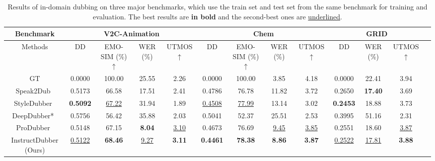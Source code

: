 \begin{table}[!t]
  \centering

  \resizebox{1.0\linewidth}{!}
  {

    \begin{tabular}{c|cccc|cccc|cccc|}
    \hline
    
    Benchmark & \multicolumn{4}{c|}{V2C-Animation} & \multicolumn{4}{c|}{Chem} & \multicolumn{3}{c}{GRID} \\
    \midrule
    Methods 
    & DD  
    & \small{EMO-SIM} (\%) $\uparrow$
    & WER (\%) 
    & \small{UTMOS} $\uparrow$   
    & DD  
    & \small{EMO-SIM} (\%) $\uparrow$
    & WER (\%) 
    & \small{UTMOS} $\uparrow$   
    & DD  
    & WER (\%) 
    & \small{UTMOS} $\uparrow$     \\
    \midrule
    GT  & 0.0000 & 100.00 & 25.55 & 2.26 & 0.0000 & 100.00 & 3.85 & 4.18 & 0.0000 & 22.41 & 3.94\\
    \midrule
    Speak2Dub~\cite{spk2dub} & 0.5173 & 66.58 & 17.51 & 2.41 & 0.4786 & 76.78 & 11.82 & 3.72 & 0.2650 & \textbf{17.40} & 3.69 \\
    StyleDubber~\cite{styledubber} & \textbf{0.5092} & \underline{67.22} & 31.94 & 1.89 & \underline{0.4508} & \underline{77.99} & 13.14 & 3.02 & \textbf{0.2453} & 18.88 & 3.73 \\
    DeepDubber*~\cite{deepdubber} & 0.5756 & 56.42 & 35.88 & 2.03 & 0.5041 & 52.37 & 25.51 & 2.53 & 0.3995 & 51.16 & 2.31 \\
    ProDubber~\cite{ProDubber} & 0.5148 & 67.15 & \textbf{8.04} & \underline{3.10} & 0.4673 & 76.69 & \underline{9.45} & \underline{3.85} & 0.2551 & 18.60 & \underline{3.87} \\
    \midrule
    InstructDubber (Ours) & \underline{0.5122} & \textbf{68.46} & \underline{9.27} & \textbf{3.11} & \textbf{0.4461} & \textbf{78.38} & \textbf{8.86} & \textbf{3.87} & \underline{0.2522} & \underline{17.81} & \textbf{3.88} \\
    \bottomrule
    \end{tabular}
    }
        \caption{
  Results of in-domain dubbing on three major benchmarks, which use the train set and test set from the same benchmark for training and evaluation. The best results are \textbf{in bold} and the second-best ones are \underline{underlined}.
  }

  \label{Ori_result}%
\end{table}%
